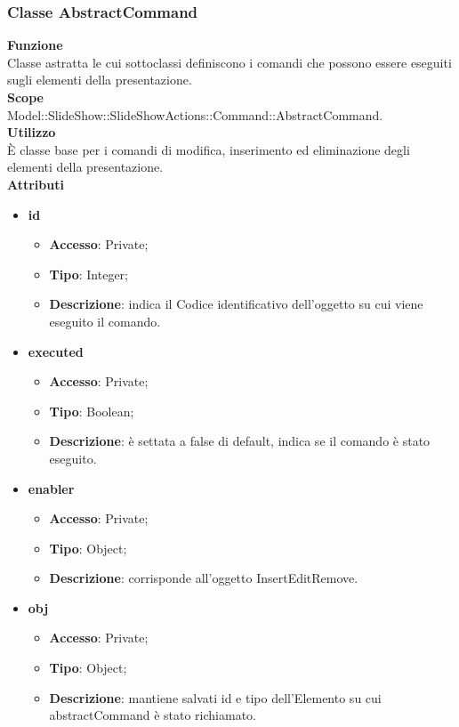 {{	\subsubsection{Classe AbstractCommand}{
		\textbf{Funzione}\\
			\indent Classe astratta le cui sottoclassi definiscono i comandi che possono essere eseguiti sugli elementi della presentazione.\\
	   	\textbf{Scope}\\
			\indent Model::SlideShow::SlideShowActions::Command::AbstractCommand.\\
		\textbf{Utilizzo}\\
			\indent È classe base per i comandi di modifica, inserimento ed eliminazione degli elementi della presentazione.\\
		\textbf{Attributi}
		\begin{itemize}
			\item \textbf{id}
			\begin{itemize}
				\item \textbf{Accesso}: Private;
				\item \textbf{Tipo}: Integer;
				\item \textbf{Descrizione}: indica il Codice identificativo dell’oggetto su cui viene eseguito il comando.
			\end{itemize}
			\item \textbf{executed}
			\begin{itemize}
				\item \textbf{Accesso}: Private;
				\item \textbf{Tipo}: Boolean;
				\item \textbf{Descrizione}: è settata a false di default, indica se il comando è stato eseguito.
			\end{itemize}
			\item \textbf{enabler}
			\begin{itemize}
				\item \textbf{Accesso}: Private;
				\item \textbf{Tipo}: Object;
				\item \textbf{Descrizione}: corrisponde all'oggetto InsertEditRemove.
			\end{itemize}
			\item \textbf{obj}
			\begin{itemize}
				\item \textbf{Accesso}: Private;
				\item \textbf{Tipo}: Object;
				\item \textbf{Descrizione}: mantiene salvati id e tipo dell'Elemento su cui abstractCommand è stato richiamato.
			\end{itemize}
		\end{itemize}
		
}}}
